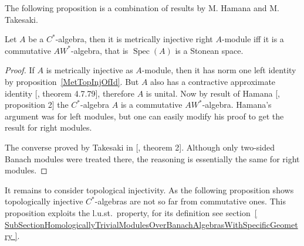 The following proposition is a combination of results by M. Hamana and M.
Takesaki.

\begin{proposition}\label{MetInjCStarAlgCharac} Let $A$ be a
$C^*$-algebra, then it is metrically injective right $A$-module iff it is a
commutative $AW^*$-algebra, that is $\operatorname{Spec}(A)$ is a Stonean space.
\end{proposition}
\begin{proof} 

If $A$ is metrically injective as $A$-module, then it has norm one left identity
by proposition~\ref{MetTopInjOfId}. But $A$ also has a contractive approximate
identity  [\cite{HelBanLocConvAlg}, theorem 4.7.79], therefore $A$ is unital.
Now by result of Hamana  [\cite{HamInjEnvBanMod}, proposition 2] the
$C^*$-algebra $A$ is a commutative $AW^*$-algebra. Hamana's argument was for
left modules, but one can easily modify his proof to get the result for right
modules.

The converse proved by Takesaki in [\cite{TakHanBanThAndJordDecomOfModMap},
theorem 2]. Although only two-sided Banach modules were treated there, the
reasoning is essentially the same for right modules.
\end{proof}

It remains to consider topological injectivity. As the following proposition
shows topologically injective $C^*$-algebras are not so far from commutative
ones. This proposition exploits the l.u.st.\ property, for its definition see
section~\ref{
    SubSectionHomologicallyTrivialModulesOverBanachAlgebrasWithSpecificGeometry
}.

